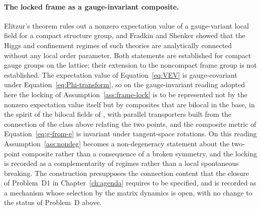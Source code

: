 \paragraph{The locked frame as a gauge-invariant composite.}
Elitzur's theorem \cite{Elitzur1975} rules out a nonzero expectation value of a gauge-variant local field for a compact structure group, and Fradkin and Shenker \cite{FradkinShenker1979} showed that the Higgs and confinement regimes of such theories are analytically connected without any local order parameter. Both statements are established for compact gauge groups on the lattice; their extension to the noncompact frame group is not established. The expectation value of Equation~\eqref{eq:VEV} is gauge-covariant under Equation~\eqref{eq:Phi-transform}, so on the gauge-invariant reading adopted here the locking of Assumption~\ref{ass:frame-lock} is to be represented not by the nonzero expectation value itself but by composites that are bilocal in the base, in the spirit of the bilocal fields of \cite{HoKawaiSteinacker2025}, with parallel transporters built from the connection of the class above relating the two points, and the composite metric of Equation~\eqref{eq:g-from-e} is invariant under tangent-space rotations. On this reading Assumption~\ref{ass:nondeg} becomes a non-degeneracy statement about the two-point composite rather than a consequence of a broken symmetry, and the locking is recorded as a complementarity of regimes rather than a local spontaneous breaking. The construction presupposes the connection content that the closure of Problem~D1 in Chapter~\ref{ch:agenda} requires to be specified, and is recorded as a mechanism whose selection by the matrix dynamics is open, with no change to the status of Problem~D above.

